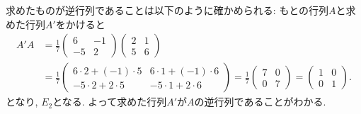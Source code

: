 \begin{checkanswer}%
  求めたものが逆行列であることは以下のように確かめられる:
  もとの行列$A$と求めた行列$A'$をかけると
  \begin{align*}
    A'A
     &=
     \frac{1}{7}
     \begin{pmatrix}
      6&-1\\-5&2
    \end{pmatrix}
    \begin{pmatrix}
      2&1\\5&6
    \end{pmatrix}\\
    &=
    \frac{1}{7}
     \begin{pmatrix}
       6\cdot 2+(-1)\cdot 5&6\cdot 1+(-1)\cdot 6\\
       -5\cdot 2+2\cdot 5&-5\cdot 1+2\cdot 6
    \end{pmatrix}
    =
    \frac{1}{7}
     \begin{pmatrix}
       7&0\\
       0&7
    \end{pmatrix}
    =
     \begin{pmatrix}
       1&0\\
       0&1
    \end{pmatrix}.
  \end{align*}
  となり, $E_2$となる.
  よって求めた行列$A'$が$A$の逆行列であることがわかる.
\end{checkanswer}
